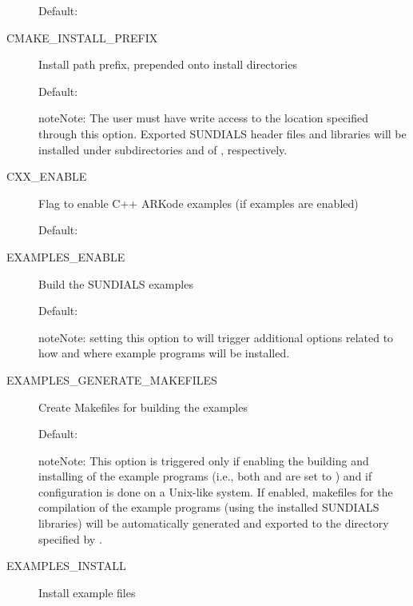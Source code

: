 \documentclass[letterpaper,10pt,english]{sphinxmanual}
\begin{document}
\begin{description}
Default: 

\item[{\index{CMAKE\_INSTALL\_PREFIX (CMake option)}CMAKE\_INSTALL\_PREFIX}] \leavevmode
Install path prefix, prepended onto install
directories

Default: 

\begin{notice}{note}{Note:}
The user must have write access to the location specified
through this option. Exported SUNDIALS header files and libraries
will be installed under subdirectories  and  of
, respectively.
\end{notice}

\item[{\index{CXX\_ENABLE (CMake option)}CXX\_ENABLE}] \leavevmode
Flag to enable C++ ARKode examples (if examples are enabled)

Default: 

\item[{\index{EXAMPLES\_ENABLE (CMake option)}EXAMPLES\_ENABLE}] \leavevmode
Build the SUNDIALS examples

Default: 

\begin{notice}{note}{Note:}
setting this option to  will trigger additional options
related to how and where example programs will be installed.
\end{notice}

\item[{\index{EXAMPLES\_GENERATE\_MAKEFILES (CMake option)}EXAMPLES\_GENERATE\_MAKEFILES}] \leavevmode
Create Makefiles for building the examples

Default: 

\begin{notice}{note}{Note:}
This option is triggered only if enabling the building and
installing of the example programs (i.e., both 
and  are set to ) and if configuration is
done on a Unix-like system. If enabled, makefiles for the
compilation of the example programs (using the installed SUNDIALS
libraries) will be automatically generated and exported to the
directory specified by .
\end{notice}

\item[{\index{EXAMPLES\_INSTALL (CMake option)}EXAMPLES\_INSTALL}] \leavevmode
Install example files


\end{description}
\end{document}
